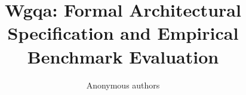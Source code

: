 \title{\textbf{Wgqa: Formal Architectural Specification and Empirical Benchmark Evaluation}}

\author{Anonymous authors}
